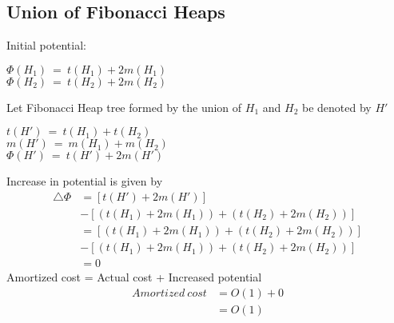 \subsection{Union of Fibonacci Heaps}
Initial potential:
\begin{center}
	$\Phi{(H_1)} \ = \ t(H_1) + 2m(H_1)$ \\
	$\Phi{(H_2)} \ = \ t(H_2) + 2m(H_2)$
\end{center}
Let Fibonacci Heap tree formed by the union of $H_1$ and $H_2$ be denoted by $H'$
\begin{center}
$t(H') \ = \ t(H_1) + t(H_2)$ \\
$m(H') \ = \ m(H_1) + m(H_2)$ \\
$\Phi{(H')} \ = \ t(H') + 2m(H')$
\end{center}
Increase in potential is given by
\begin{equation}
	\begin{split}
		\triangle{\Phi} &= [t(H')+2m(H')] \\ 
		& - [ (t(H_1) + 2m(H_1)) + (t(H_2) + 2m(H_2)) ]
		\\&= [ (t(H_1) + 2m(H_1)) + (t(H_2) + 2m(H_2)) ] \\
		& - [ (t(H_1) + 2m(H_1)) + (t(H_2) + 2m(H_2)) ]
		\\&= 0
	\end{split}
\end{equation}
Amortized cost = Actual cost + Increased potential
\begin{equation}
\begin{split}
Amortized \ cost &= O(1) + 0
\\&= O(1)
\end{split}
\end{equation}
